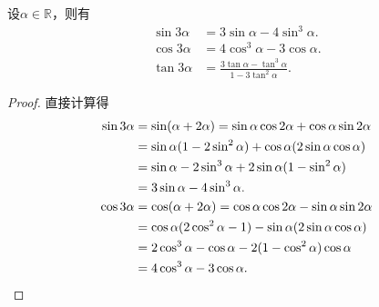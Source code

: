 \begin{proposition}
设\(\alpha\in\mathbb{R}\)，则有\begin{align}
	\sin3\alpha &= 3 \sin\alpha - 4 \sin^3\alpha. \\
	\cos3\alpha &= 4 \cos^3\alpha - 3 \cos\alpha. \\
	\tan3\alpha &= \frac{3 \tan\alpha - \tan^3\alpha}{1 - 3\tan^2\alpha}.
\end{align}
\begin{proof}
直接计算得\begin{align*}
	\sin3\alpha &= \sin(\alpha+2\alpha)
	= \sin\alpha\cos2\alpha + \cos\alpha\sin2\alpha \\
	&= \sin\alpha(1-2\sin^2\alpha)
		+ \cos\alpha(2\sin\alpha\cos\alpha) \\
	&= \sin\alpha-2\sin^3\alpha
		+ 2\sin\alpha(1-\sin^2\alpha) \\
	&= 3\sin\alpha-4\sin^3\alpha. \\
	\cos3\alpha &= \cos(\alpha+2\alpha)
	= \cos\alpha\cos2\alpha - \sin\alpha\sin2\alpha \\
	&= \cos\alpha(2\cos^2\alpha-1) - \sin\alpha(2\sin\alpha\cos\alpha) \\
	&= 2\cos^3\alpha - \cos\alpha
		- 2(1-\cos^2\alpha)\cos\alpha \\
	&= 4\cos^3\alpha - 3\cos\alpha.
	\qedhere
\end{align*}
\end{proof}
\end{proposition}

